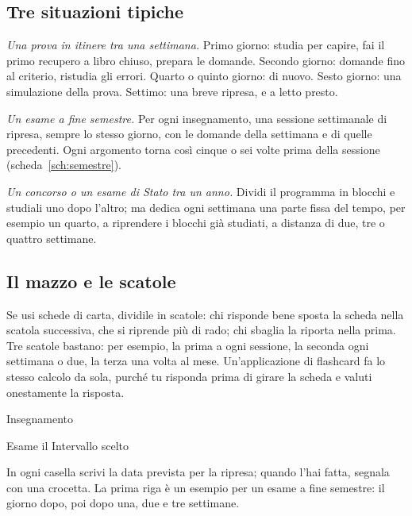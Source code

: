 \subsection*{Tre situazioni tipiche}

{\small\emph{Una prova in itinere tra una settimana.} Primo giorno: studia per
capire, fai il primo recupero a libro chiuso, prepara le domande.
Secondo giorno: domande fino al criterio, ristudia gli errori. Quarto o
quinto giorno: di nuovo. Sesto giorno: una simulazione della prova.
Settimo: una breve ripresa, e a letto presto.

\emph{Un esame a fine semestre.} Per ogni insegnamento, una sessione
settimanale di ripresa, sempre lo stesso giorno, con le domande della
settimana e di quelle precedenti. Ogni argomento torna così cinque o
sei volte prima della sessione (scheda~\ref{sch:semestre}).

\emph{Un concorso o un esame di Stato tra un anno.} Dividi il programma
in blocchi e studiali uno dopo l'altro; ma dedica ogni settimana una
parte fissa del tempo, per esempio un quarto, a riprendere i blocchi
già studiati, a distanza di due, tre o quattro settimane.\par}

\subsection*{Il mazzo e le scatole}

{\small Se usi schede di carta, dividile in scatole: chi risponde bene
sposta la scheda nella scatola successiva, che si riprende più di rado;
chi sbaglia la riporta nella prima. Tre scatole bastano: per esempio, la
prima a ogni sessione, la seconda ogni settimana o due, la terza una
volta al mese. Un'applicazione di flashcard fa lo stesso calcolo da
sola, purché tu risponda prima di girare la scheda e valuti
onestamente la risposta.\par}


{\small\noindent Insegnamento \hrulefill\par
\vspace{0.4\baselineskip}
\noindent Esame il \hrulefill\quad Intervallo scelto \hrulefill\par}
\vspace{0.6\baselineskip}

{\footnotesize\noindent In ogni casella scrivi la data prevista per la
ripresa; quando l'hai fatta, segnala con una crocetta. La prima riga è
un esempio per un esame a fine semestre: il giorno dopo, poi dopo una,
due e tre settimane.\par}
\vspace{0.6\baselineskip}

